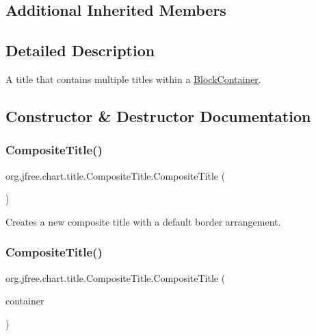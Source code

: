 \subsection*{Additional Inherited Members}


\subsection{Detailed Description}
A title that contains multiple titles within a \mbox{\hyperlink{}{Block\+Container}}. 

\subsection{Constructor \& Destructor Documentation}
\mbox{\label{classorg_1_1jfree_1_1chart_1_1title_1_1_composite_title_a09aded3ba50f736b7396d87335bbb04f}} 
\subsubsection{\texorpdfstring{Composite\+Title()}{CompositeTitle()}\hspace{0.1cm}{\footnotesize\ttfamily [1/2]}}
{\footnotesize\ttfamily org.\+jfree.\+chart.\+title.\+Composite\+Title.\+Composite\+Title (\begin{DoxyParamCaption}{ }\end{DoxyParamCaption})}

Creates a new composite title with a default border arrangement. \mbox{\label{classorg_1_1jfree_1_1chart_1_1title_1_1_composite_title_a40b1bf3e44816cf7e6d1dc3ce925610c}} 
\subsubsection{\texorpdfstring{Composite\+Title()}{CompositeTitle()}\hspace{0.1cm}{\footnotesize\ttfamily [2/2]}}
{\footnotesize\ttfamily org.\+jfree.\+chart.\+title.\+Composite\+Title.\+Composite\+Title (\begin{DoxyParamCaption}\item[{\mbox{\hyperlink{classorg_1_1jfree_1_1chart_1_1block_1_1_block_container}{Block\+Container}}}]{container }\end{DoxyParamCaption})}

